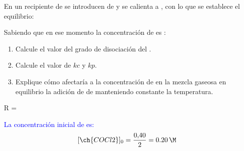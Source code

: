 \begin{exerciseEVAU}
    En un recipiente de  se introducen  de  y se calienta a , con lo que se establece el equilibrio:
    \begin{center}
    \end{center}
    Sabiendo que en ese momento la concentración de  es :
    \begin{enumerate}[label=\letraminuscula]
        \item Calcule el valor del grado de disociación del .
        \item Calcule el valor de \(kc\) y \(kp\).
        \item Explique cómo afectaría a la concentración de  en la mezcla gaseosa en equilibrio la adición de  de  manteniendo constante la temperatura.
    \end{enumerate}
    \datos{} R = \ctegases{}
    \begin{solu}

    \textcolor{blue}{La concentración inicial de  es:}
    \[
        [\ch{COCl2}]_0 = \frac{0{,}40}{2} = \qty{0{,}20}{\M}
    \]


\end{solu}
\end{exerciseEVAU}
